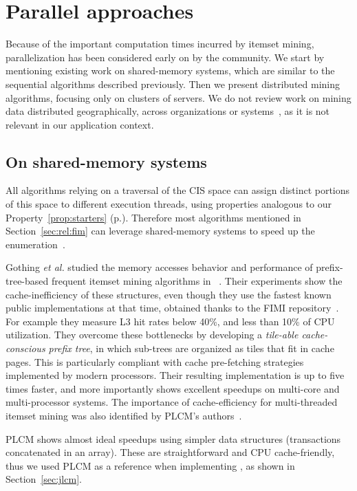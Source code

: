\section{Parallel approaches}
\label{sec:rel:par}

Because of the important computation times incurred by itemset mining,
parallelization has been considered early on by the community.
We start by mentioning existing work on shared-memory systems,
which are similar to the sequential algorithms described previously.
Then we present distributed mining algorithms, focusing only on clusters of servers.
We do not review work on mining data distributed geographically,
across organizations or systems~\cite{KumarIIC06},
as it is not relevant in our application context.



\subsection{On shared-memory systems}
\label{sec:rel:multithreaded}

All algorithms relying on a traversal of the CIS space can assign distinct portions of this space to
different execution threads,
using properties analogous to our Property~\ref{prop:starters} (p.\pageref{prop:starters}).
Therefore most algorithms mentioned in Section~\ref{sec:rel:fim}
can leverage shared-memory systems to speed up the enumeration~\cite{ZakiDMKD97,LuccheseICDM07,ZaianeICDM01}.

Gothing {\em et al.} studied the memory accesses behavior and performance
of prefix-tree-based frequent itemset mining algorithms in ~\cite{GhotingVLDBJ07}.
Their experiments show the cache-inefficiency of these structures,
even though they use the fastest known public implementations at that time,
obtained thanks to the FIMI repository~\cite{FIMI03}.
For example they measure L3 hit rates below 40\%,
and less than 10\% of CPU utilization.
They overcome these bottlenecks by developing a
{\em tile-able cache-conscious prefix tree},
in which sub-trees are organized as tiles that fit in cache pages.
This is particularly compliant with cache pre-fetching strategies implemented by modern processors.
Their resulting implementation is up to five times faster,
and more importantly shows excellent speedups on multi-core and multi-processor systems.
The importance of cache-efficiency for multi-threaded itemset mining was also
identified by PLCM's authors~\cite{NegrevergneHPCS10}.

PLCM shows almost ideal speedups using simpler data structures
(transactions concatenated in an array).
These  are straightforward and CPU cache-friendly,
thus we used PLCM as a reference when implementing \jlcm, as shown in Section~\ref{sec:jlcm}.



